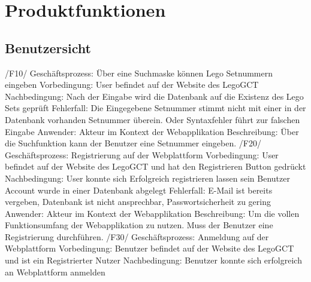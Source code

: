 \section{Produktfunktionen}

\subsection{Benutzersicht}

/F10/ \newline
Geschäftsprozess: Über eine Suchmaske können Lego Setnummern eingeben\newline
Vorbedingung: User befindet auf der Website des LegoGCT\newline
Nachbedingung: Nach der Eingabe wird die Datenbank auf die Existenz des Lego Sets geprüft\newline
Fehlerfall: Die Eingegebene Setnummer stimmt nicht mit einer in der Datenbank vorhanden Setnummer überein. Oder Syntaxfehler führt zur falschen Eingabe\newline
Anwender: Akteur im Kontext der Webapplikation\newline
Beschreibung: Über die Suchfunktion kann der Benutzer eine Setnummer eingeben.\newline\newline
/F20/\newline
Geschäftsprozess: Registrierung auf der Webplattform\newline
Vorbedingung: User befindet auf der Website des LegoGCT und hat den Registrieren Button gedrückt\newline
Nachbedingung: User konnte sich Erfolgreich registrieren lassen sein Benutzer Account wurde in einer Datenbank abgelegt\newline
Fehlerfall: E-Mail ist bereits vergeben, Datenbank ist nicht ansprechbar, Passwortsicherheit zu gering\newline
Anwender: Akteur im Kontext der Webapplikation\newline
Beschreibung: Um die vollen Funktionsumfang der Webapplikation zu nutzen. Muss der Benutzer eine Registrierung durchführen.\newline\newline
/F30/\newline
Geschäftsprozess: Anmeldung auf der Webplattform\newline
Vorbedingung: Benutzer befindet auf der Website des LegoGCT und ist ein Registrierter Nutzer\newline
Nachbedingung: Benutzer konnte sich erfolgreich an Webplattform anmelden\newline
